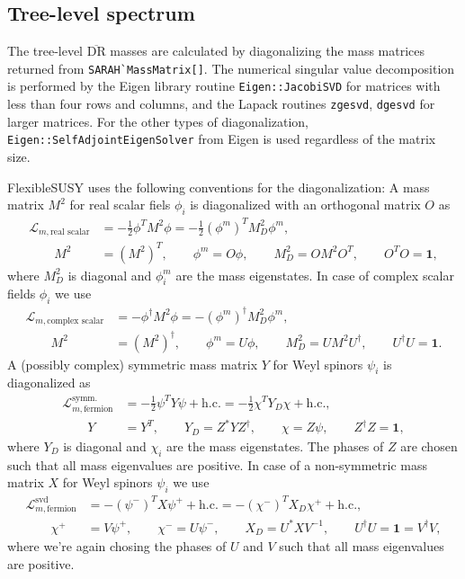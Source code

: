 \documentclass[final,3p,11pt,pdflatex]{elsarticle}
\newcommand{\fs}{FlexibleSUSY\xspace}
\newcommand{\code}[1]{\lstinline|#1|}  %
\newcommand{\textoverline}[1]{$\overline{\mbox{#1}}$}
\newcommand{\DRbar}{\textoverline{DR}\xspace}
\newcommand{\Lagr}{\mathcal{L}}
\newcommand{\unity}{\mathbf{1}}
\begin{document}
\subsection{Tree-level spectrum}
The tree-level \DRbar masses are calculated by diagonalizing the mass
matrices returned from \code{SARAH`MassMatrix[]}.  The numerical
singular value decomposition is performed by the Eigen library routine
\code{Eigen::JacobiSVD} for matrices with less than four rows and
columns, and the Lapack routines \code{zgesvd}, \code{dgesvd} for
larger matrices.  For the other types of diagonalization,
\code{Eigen::SelfAdjointEigenSolver} from Eigen is used regardless of
the matrix size.

\fs uses the following conventions for the diagonalization: A mass
matrix $M^2$ for real scalar fiels $\phi_i$ is diagonalized with an
orthogonal matrix $O$ as
%
\begin{align}
  \Lagr_{m,\text{real scalar}}
  &= - \frac{1}{2} \phi^T M^2 \phi
  = - \frac{1}{2} (\phi^m)^T M^2_D \phi^m, \\
  \qquad M^2 &= (M^2)^T ,
  \qquad \phi^m = O \phi ,
  \qquad M^2_D = O M^2 O^T ,
  \qquad O^T O = \unity ,
\end{align}
%
where $M^2_D$ is diagonal and $\phi^m_i$ are the mass eigenstates.  In
case of complex scalar fields $\phi_i$ we use
%
\begin{align}
  \Lagr_{m,\text{complex scalar}}
  &= - \phi^\dagger M^2 \phi
  = - (\phi^m)^\dagger M^2_D \phi^m, \\
  \qquad M^2 &= (M^2)^\dagger ,
  \qquad \phi^m = U \phi ,
  \qquad M^2_D = U M^2 U^\dagger ,
  \qquad U^\dagger U = \unity .
\end{align}
%
A (possibly complex) symmetric mass matrix $Y$ for Weyl spinors
$\psi_i$ is diagonalized as
%
\begin{align}
  \Lagr_{m,\text{fermion}}^\text{symm.}
  &= - \frac{1}{2} \psi^T Y \psi + \text{h.c.}
  = - \frac{1}{2} \chi^T Y_D \chi + \text{h.c.}, \\
  \qquad Y &= Y^T ,
  \qquad Y_D = Z^* Y Z^\dagger ,
  \qquad \chi = Z \psi ,
  \qquad Z^\dagger Z = \unity ,
\end{align}
%
where $Y_D$ is diagonal and $\chi_i$ are the mass eigenstates.  The
phases of $Z$ are chosen such that all mass eigenvalues are positive.
In case of a non-symmetric mass matrix $X$ for Weyl spinors $\psi_i$
we use
%
\begin{align}
  \Lagr_{m,\text{fermion}}^\text{svd}
  &= - (\psi^-)^T X \psi^+ + \text{h.c.}
  = - (\chi^-)^T X_D \chi^+ + \text{h.c.}, \\
  \qquad \chi^+ &= V \psi^+ ,
  \qquad \chi^- = U \psi^- ,
  \qquad X_D = U^* X V^{-1} ,
  \qquad U^\dagger U = \unity = V^\dagger V ,
\end{align}
%
where we're again chosing the phases of $U$ and $V$ such that all mass
eigenvalues are positive.
\end{document}
